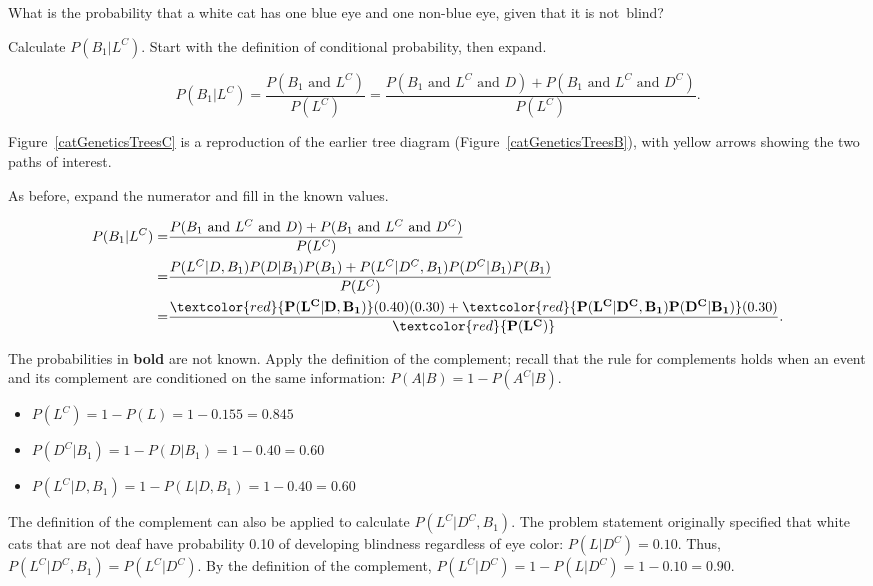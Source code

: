 \textD{\newpage}

\begin{examplewrap}
\begin{nexample}{What is the probability that a white cat has one blue eye and one non-blue eye, given that it is not~blind?}

Calculate $P(B_1|L^C)$. Start with the definition of conditional probability, then expand.

\[P(B_1|L^C) = \dfrac{P(B_1 \textrm{ and } L^C)}{P(L^C)} = \frac{P(B_1 \textrm{ and } L^C \textrm{ and } D) + P(B_1 \textrm{ and } L^C \textrm{ and } D^C)}{P(L^C)}. \]


Figure~\ref{catGeneticsTreesC} is a reproduction of the earlier tree diagram (Figure~\ref{catGeneticsTreesB}), with yellow arrows showing the two paths of interest.
	
	As before, expand the numerator and fill in the known values.
	
	\begin{align*}
	P(B_1|L^C) =& \frac{P(B_1 \textrm{ and } L^C \textrm{ and } D) + P(B_1 \textrm{ and } L^C \textrm{ and } D^C)}{P(L^C)}\\
	=& \frac{P(L^C|D, B_1)P(D|B_1)P(B_1) + P(L^C|D^C, B_1)P(D^C|B_1)P(B_1)}{P(L^C)} \\
	=& \frac{\textcolor{red}{\mathbf{P(L^C|D, B_1)}}(0.40)(0.30) + \textcolor{red}{\mathbf{P(L^C|D^C, B_1)P(D^C|B_1)}}(0.30)}{\textcolor{red}{\mathbf{P(L^C)}}}.
	\end{align*} 
	
	The probabilities in \textbf{\color{red}bold} are not known. Apply the definition of the complement; recall that the rule for complements holds when an event and its complement are conditioned on the same information: $P(A|B) = 1 - P(A^C|B)$.
	
	\begin{itemize}
		\item $P(L^C) = 1 - P(L) = 1 - 0.155 = 0.845$
		\item $P(D^C|B_1) = 1 - P(D|B_1) = 1 - 0.40 = 0.60$
		\item $P(L^C|D, B_1) = 1 - P(L|D, B_1) = 1 - 0.40 = 0.60$
	\end{itemize}
	
	The definition of the complement can also be applied to calculate $P(L^C|D^C, B_1)$. The problem statement originally specified that white cats that are not deaf have probability 0.10 of developing blindness regardless of eye color: $P(L|D^C) = 0.10$. Thus, $P(L^C|D^C, B_1) = P(L^C|D^C)$. By the definition of the complement, $P(L^C|D^C) = 1 - P(L|D^C) = 1 - 0.10 = 0.90$.
	

\end{nexample}
\end{examplewrap}

